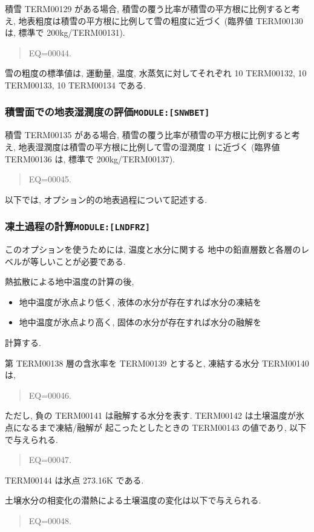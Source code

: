 積雪 TERM00129 がある場合, 
積雪の覆う比率が積雪の平方根に比例すると考え,
地表粗度は積雪の平方根に比例して雪の粗度に近づく
(臨界値 TERM00130 は, 標準で 200kg/TERM00131).
%
\begin{quote}
EQ=00044.
\end{quote}
%
雪の粗度の標準値は, 運動量, 温度, 水蒸気に対してそれぞれ
10 TERM00132, 10 TERM00133, 10 TERM00134 である. 

\subsubsection{積雪面での地表湿潤度の評価\texttt{MODULE:[SNWBET]}}

積雪 TERM00135 がある場合, 
積雪の覆う比率が積雪の平方根に比例すると考え,
地表湿潤度は積雪の平方根に比例して雪の湿潤度 1 に近づく
(臨界値 TERM00136 は, 標準で 200kg/TERM00137).
%
\begin{quote}
EQ=00045.
\end{quote}

\bigskip
以下では, オプション的の地表過程について記述する.
\bigskip

\subsubsection{凍土過程の計算\texttt{MODULE:[LNDFRZ]}}

このオプションを使うためには, 温度と水分に関する
地中の鉛直層数と各層のレベルが等しいことが必要である. 

熱拡散による地中温度の計算の後, 
\begin{itemize}
  \item 地中温度が氷点より低く, 液体の水分が存在すれば水分の凍結を
  \item 地中温度が氷点より高く, 固体の水分が存在すれば水分の融解を
\end{itemize}
計算する. 

第 TERM00138 層の含氷率を TERM00139 とすると, 凍結する水分 TERM00140 は, 
\begin{quote}
EQ=00046.
\end{quote}
ただし, 負の TERM00141 は融解する水分を表す. 
TERM00142 は土壌温度が氷点になるまで凍結/融解が
起こったとしたときの TERM00143 の値であり, 以下で与えられる. 
\begin{quote}
EQ=00047.
\end{quote}
TERM00144 は氷点 273.16K である. 

土壌水分の相変化の潜熱による土壌温度の変化は以下で与えられる. 
\begin{quote}
EQ=00048.
\end{quote}

